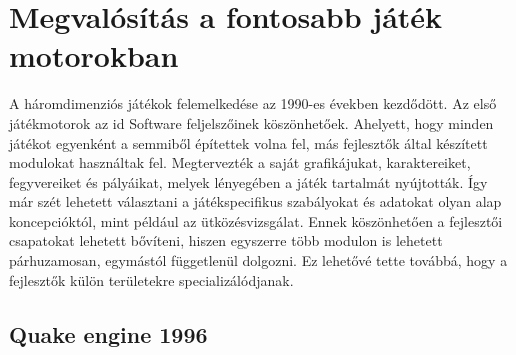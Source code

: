

\section{Megvalósítás a fontosabb játék motorokban}

A háromdimenziós játékok felemelkedése az 1990-es években kezdődött. Az első játékmotorok az id Software feljelszőinek köszönhetőek. Ahelyett, hogy minden játékot egyenként a semmiből építettek volna fel, más fejlesztők által készített modulokat használtak fel. Megtervezték a saját grafikájukat, karaktereiket, fegyvereiket és pályáikat, melyek lényegében a játék tartalmát nyújtották. Így már szét lehetett választani a játékspecifikus szabályokat és adatokat olyan alap koncepcióktól, mint például az ütközésvizsgálat. Ennek köszönhetően a fejlesztői csapatokat lehetett bővíteni, hiszen egyszerre több modulon is lehetett párhuzamosan, egymástól függetlenül dolgozni. Ez lehetővé tette továbbá, hogy a fejlesztők külön területekre specializálódjanak.
\cite{wikiGameEngine}


\subsection{Quake engine 1996}




